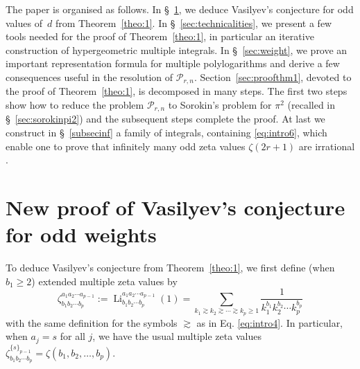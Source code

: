 \documentclass[reqno,12pt]{amsart}
\numberwithin{equation}{section}
\theoremstyle{remark}
\def\li{\operatorname{Li}}
\begin{document}
The paper is organised as follows.   In \S~\ref{sec:Vasilyev}, we deduce Vasilyev's  conjecture for odd values of~$d$ 
from Theorem~\ref{theo:1}. In \S~\ref{sec:technicalities}, we present a few tools needed for the proof of 
Theorem~\ref{theo:1}, in particular an iterative construction of hypergeometric multiple  integrals. 
In \S~\ref{sec:weight}, 
we prove an important representation formula for multiple polylogarithms and derive  a few consequences useful in 
the resolution of $\mathcal{P}_{r,n}$. Section~\ref{sec:proofthm1}, devoted to the proof of Theorem~\ref{theo:1}, 
is decomposed in many steps. The first 
two steps show  how to reduce the problem $\mathcal{P}_{r,n}$ to Sorokin's problem for $\pi^2$ (recalled in 
\S~\ref{sec:sorokinpi2}) and the subsequent steps complete the proof. At last we 
construct in \S~\ref{subsecinf} a family of integrals, containing \eqref{eq:intro6}, 
which enable one to prove that infinitely many odd zeta values  $\zeta(2r+1)$ are irrational \cite{BR, rivoal}. 







\section{New proof of Vasilyev's  conjecture for  odd weights} \label{sec:Vasilyev}


To deduce Vasilyev's  conjecture from Theorem~\ref{theo:1}, we first define (when $b_1\geq 2$)   
extended multiple zeta values by
\begin{equation}\label{eq15bis}
\zeta_{b_1b_2\cdots b_p}^{a_1a_2\cdots a_{p-1}}:=\li_{b_1b_2\cdots b_p}^{a_1a_2\cdots a_{p-1}}(1) = 
\sum_{k_1\gtrsim k_2\gtrsim \cdots \gtrsim k_p\ge 1} \frac{1}{k_1^{b_1}k_2^{b_2}\cdots k_p^{b_p}}
\end{equation}
with the same definition for the symbols $\gtrsim$ as in Eq. \eqref{eq:intro4}.  
In particular, when $a_j=s$ for all $j$, we have the usual multiple zeta values 
$\zeta_{b_1b_2\cdots b_p}^{ \{s\}_{p-1}}=\zeta(b_1,b_2,\ldots, b_p)$.

\bigskip
\end{document}
